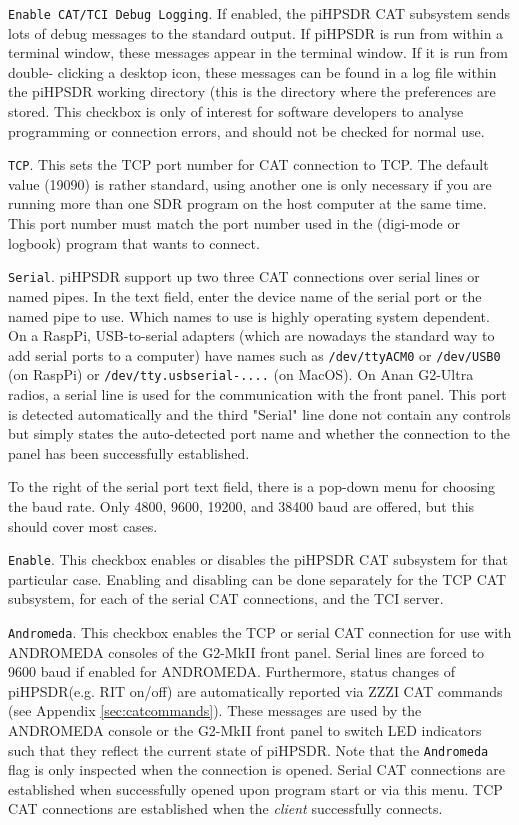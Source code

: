 \documentclass[12pt]{book}
\def\rett#1{\texttt{\color{red}#1}}
\def\pH{pi\-HPSDR\xspace}
\begin{document}
\rett{Enable CAT/TCI Debug Logging}. If enabled, the \pH CAT subsystem sends lots of debug messages to the standard output. If
\pH is run
from within a terminal window, these messages appear in the terminal window. If it is run from double-
clicking a desktop icon,
these messages can be found in a log file within the \pH working directory (this is the directory where
the preferences
are stored. This checkbox is only of interest for software developers to analyse programming or connection
errors, and should
not be checked for normal use.

\rett{TCP}. This sets the TCP port number for CAT connection to TCP. The default value (19090)
is rather standard, using another one is only necessary if you are running more than one
SDR program on the host computer at the same time.
This port number must match the port number used in the (digi-mode or logbook) program that wants to connect.

\rett{Serial}. \pH support up two three CAT connections over serial lines or named pipes.
In the text field, enter the device name of the serial port or the named pipe to use.
Which names to use
is highly operating system dependent. On a RaspPi,  USB-to-serial
adapters (which are nowadays the standard way to add serial ports to a computer) have names such as
\texttt{/dev/ttyACM0} or \texttt{/dev/USB0} (on RaspPi) or \texttt{/dev/tty.usbserial-....} (on MacOS).
On Anan G2-Ultra radios, a serial line is used for the communication with the front panel. This
port is detected automatically and the third "Serial" line done not contain any controls but simply
states the auto-detected port name and whether the connection to the panel has been successfully
established.


To the right of the serial port text field, there is a pop-down menu for choosing the baud rate. Only 4800,
9600, 19200, and 38400 baud are offered, but this should cover most cases.

\rett{Enable}. This checkbox enables or disables the \pH CAT subsystem for that particular case.
Enabling and disabling can be done separately for the TCP CAT subsystem, for each of the serial
CAT connections, and the TCI server.

\rett{Andromeda}. This checkbox enables the TCP or  serial CAT connection for use with ANDROMEDA consoles
of the G2-MkII front panel. Serial lines are
forced to 9600 baud if enabled for ANDROMEDA. Furthermore, status changes of \pH (e.g. RIT on/off) are
automatically reported via ZZZI CAT commands (see Appendix \ref{sec:catcommands}). These messages are
used by the ANDROMEDA console or the G2-MkII front panel
to switch LED indicators such that they reflect the current state
of \pH. Note that the \rett{Andromeda} flag is only inspected when the connection is opened. Serial CAT connections
are established when successfully opened upon program start or via this menu.
TCP CAT connections are established when the \textit{client} successfully connects.
\end{document}
